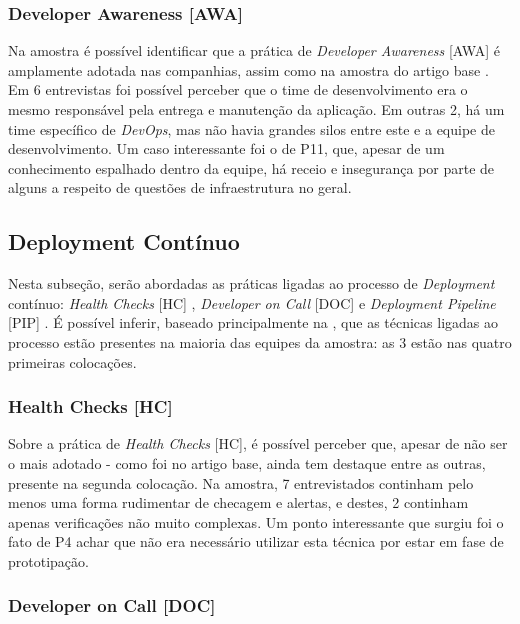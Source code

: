 \subsubsection{Developer Awareness [AWA]}

Na amostra é possível identificar que a prática de \emph{Developer Awareness} [AWA] é amplamente adotada nas companhias, assim como na amostra do artigo base . Em 6 entrevistas foi possível perceber que o time de desenvolvimento era o mesmo responsável pela entrega e manutenção da aplicação. Em outras 2, há um time específico de \emph{DevOps}, mas não havia grandes silos entre este e a equipe de desenvolvimento. Um caso interessante foi o de P11, que, apesar de um conhecimento espalhado dentro da equipe, há receio e insegurança por parte de alguns a respeito de questões de infraestrutura no geral.


\subsection{Deployment Contínuo}

Nesta subseção, serão abordadas as práticas ligadas ao processo de \emph{Deployment} contínuo: \emph{Health Checks} [HC] \cite{devopsBook}, \emph{Developer on Call} [DOC] \cite{devAndDeploymentFB} e \emph{Deployment Pipeline} [PIP] \cite{devopsBook}. É possível inferir, baseado principalmente na , que as técnicas ligadas ao processo estão presentes na maioria das equipes da amostra: as 3 estão nas quatro primeiras colocações. 

\subsubsection{Health Checks [HC]}

Sobre a prática de \emph{Health Checks} [HC], é possível perceber que, apesar de não ser o mais adotado - como foi no artigo base, ainda tem destaque entre as outras, presente na segunda colocação. Na amostra, 7 entrevistados continham pelo menos uma forma rudimentar de checagem e alertas, e destes, 2 continham apenas verificações não muito complexas. Um ponto interessante que surgiu foi o fato de P4 achar que não era necessário utilizar esta técnica por estar em fase de prototipação.

\subsubsection{Developer on Call [DOC]}

